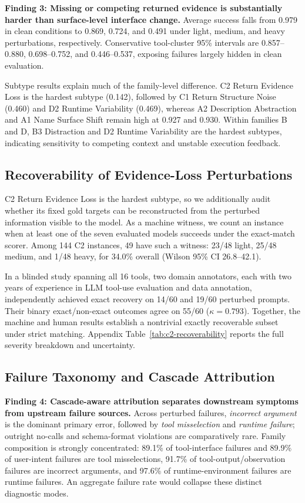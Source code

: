 \documentclass[11pt]{article}
\begin{document}
\noindent\textbf{Finding 3: Missing or competing returned evidence is substantially harder than surface-level interface change.}
Average success falls from 0.979 in clean conditions to 0.869, 0.724, and 0.491 under light, medium, and heavy perturbations, respectively. Conservative tool-cluster 95\% intervals are 0.857--0.880, 0.698--0.752, and 0.446--0.537, exposing failures largely hidden in clean evaluation.

Subtype results explain much of the family-level difference. C2 Return Evidence Loss is the hardest subtype (0.142), followed by C1 Return Structure Noise (0.460) and D2 Runtime Variability (0.469), whereas A2 Description Abstraction and A1 Name Surface Shift remain high at 0.927 and 0.930. Within families B and D, B3 Distraction and D2 Runtime Variability are the hardest subtypes, indicating sensitivity to competing context and unstable execution feedback.

\subsection{Recoverability of Evidence-Loss Perturbations}

C2 Return Evidence Loss is the hardest subtype, so we additionally audit whether its fixed gold targets can be reconstructed from the perturbed information visible to the model. As a machine witness, we count an instance when at least one of the seven evaluated models succeeds under the exact-match scorer. Among 144 C2 instances, 49 have such a witness: 23/48 light, 25/48 medium, and 1/48 heavy, for 34.0\% overall (Wilson 95\% CI 26.8--42.1).

In a blinded study spanning all 16 tools, two domain annotators, each with two years of experience in LLM tool-use evaluation and data annotation, independently achieved exact recovery on 14/60 and 19/60 perturbed prompts. Their binary exact/non-exact outcomes agree on 55/60 ($\kappa=0.793$). Together, the machine and human results establish a nontrivial exactly recoverable subset under strict matching. Appendix Table~\ref{tab:c2-recoverability} reports the full severity breakdown and uncertainty.

\subsection{Failure Taxonomy and Cascade Attribution}

\noindent\textbf{Finding 4: Cascade-aware attribution separates downstream symptoms from upstream failure sources.}
Across perturbed failures, \emph{incorrect argument} is the dominant primary error, followed by \emph{tool misselection} and \emph{runtime failure}; outright no-calls and schema-format violations are comparatively rare. Family composition is strongly concentrated: 89.1\% of tool-interface failures and 89.9\% of user-intent failures are tool misselections, 91.7\% of tool-output/observation failures are incorrect arguments, and 97.6\% of runtime-environment failures are runtime failures. An aggregate failure rate would collapse these distinct diagnostic modes.
\end{document}
